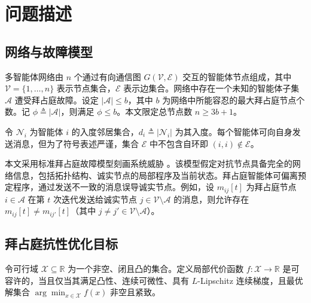 \section{问题描述}

\subsection{网络与故障模型}
\quad \quad  多智能体网络由 $n$ 个通过有向通信图 $G(\mathcal{V},\mathcal{E})$ 交互的智能体节点组成，其中 $\mathcal{V} = \{1,\ldots,n\}$ 表示节点集合，$\mathcal{E}$ 表示边集合。网络中存在一个未知的智能体子集 $\mathcal{A}$ 遭受拜占庭故障。设定 $|\mathcal{A}| \le b$，其中 $b$ 为网络中所能容忍的最大拜占庭节点个数。记 $\phi \triangleq |\mathcal{A}|$，则满足 $\phi \le b$。本文限定总节点数 $n \ge 3b+1$。

令 $\mathcal{N}_i$ 为智能体 $i$ 的入度邻居集合，$d_i \triangleq |\mathcal{N}_i|$ 为其入度。每个智能体可向自身发送消息，但为了符号表述严谨，集合 $\mathcal{E}$ 中不包含自环即 $(i,i)\notin\mathcal{E}$。

本文采用标准拜占庭故障模型刻画系统威胁 \cite{lynch1996distributed}。该模型假定对抗节点具备完全的网络信息，包括拓扑结构、诚实节点的局部程序及当前状态。拜占庭智能体可偏离预定程序，通过发送不一致的消息误导诚实节点。例如，设 $m_{ij}[t]$ 为拜占庭节点 $i\in\mathcal{A}$ 在第 $t$ 次迭代发送给诚实节点 $j\in\mathcal{V}\setminus\mathcal{A}$ 的消息，则允许存在 $m_{ij}[t] \neq m_{ij'}[t]$（其中 $j\neq j'\in\mathcal{V}\setminus\mathcal{A}$）。

\subsection{拜占庭抗性优化目标}
\quad \quad  令可行域 $\mathcal{X}\subseteq\mathbb{R}$ 为一个非空、闭且凸的集合。定义局部代价函数 $f:\mathcal{X}\to\mathbb{R}$ 是可容许的，当且仅当其满足凸性、连续可微性、具有 $L$-Lipschitz 连续梯度，且最优解集合 $\arg\min_{x\in\mathcal{X}} f(x)$ 非空且紧致。

